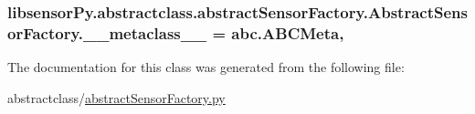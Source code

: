 \subsubsection[{\+\_\+\+\_\+metaclass\+\_\+\+\_\+}]{\setlength{\rightskip}{0pt plus 5cm}libsensor\+Py.\+abstractclass.\+abstract\+Sensor\+Factory.\+Abstract\+Sensor\+Factory.\+\_\+\+\_\+metaclass\+\_\+\+\_\+ = abc.\+A\+B\+C\+Meta\hspace{0.3cm}{\ttfamily [static]}, {\ttfamily [private]}}\label{classlibsensorPy_1_1abstractclass_1_1abstractSensorFactory_1_1AbstractSensorFactory_aae483f8787e962f3936962e656594fa1}


The documentation for this class was generated from the following file\+:\begin{DoxyCompactItemize}
\item 
abstractclass/\hyperlink{abstractclass_2abstractSensorFactory_8py}{abstract\+Sensor\+Factory.\+py}\end{DoxyCompactItemize}
